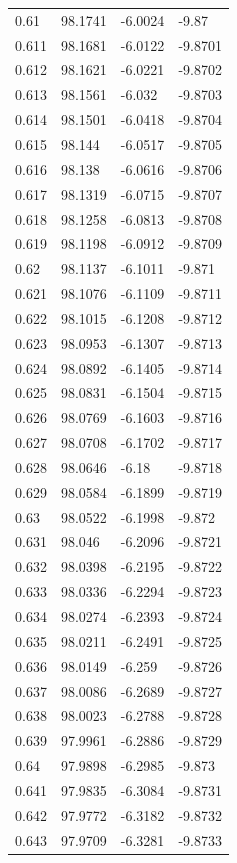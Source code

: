 \begin{tabular}{llll}
0.61 & 98.1741 & -6.0024 & -9.87 \\
0.611 & 98.1681 & -6.0122 & -9.8701 \\
0.612 & 98.1621 & -6.0221 & -9.8702 \\
0.613 & 98.1561 & -6.032 & -9.8703 \\
0.614 & 98.1501 & -6.0418 & -9.8704 \\
0.615 & 98.144 & -6.0517 & -9.8705 \\
0.616 & 98.138 & -6.0616 & -9.8706 \\
0.617 & 98.1319 & -6.0715 & -9.8707 \\
0.618 & 98.1258 & -6.0813 & -9.8708 \\
0.619 & 98.1198 & -6.0912 & -9.8709 \\
0.62 & 98.1137 & -6.1011 & -9.871 \\
0.621 & 98.1076 & -6.1109 & -9.8711 \\
0.622 & 98.1015 & -6.1208 & -9.8712 \\
0.623 & 98.0953 & -6.1307 & -9.8713 \\
0.624 & 98.0892 & -6.1405 & -9.8714 \\
0.625 & 98.0831 & -6.1504 & -9.8715 \\
0.626 & 98.0769 & -6.1603 & -9.8716 \\
0.627 & 98.0708 & -6.1702 & -9.8717 \\
0.628 & 98.0646 & -6.18 & -9.8718 \\
0.629 & 98.0584 & -6.1899 & -9.8719 \\
0.63 & 98.0522 & -6.1998 & -9.872 \\
0.631 & 98.046 & -6.2096 & -9.8721 \\
0.632 & 98.0398 & -6.2195 & -9.8722 \\
0.633 & 98.0336 & -6.2294 & -9.8723 \\
0.634 & 98.0274 & -6.2393 & -9.8724 \\
0.635 & 98.0211 & -6.2491 & -9.8725 \\
0.636 & 98.0149 & -6.259 & -9.8726 \\
0.637 & 98.0086 & -6.2689 & -9.8727 \\
0.638 & 98.0023 & -6.2788 & -9.8728 \\
0.639 & 97.9961 & -6.2886 & -9.8729 \\
0.64 & 97.9898 & -6.2985 & -9.873 \\
0.641 & 97.9835 & -6.3084 & -9.8731 \\
0.642 & 97.9772 & -6.3182 & -9.8732 \\
0.643 & 97.9709 & -6.3281 & -9.8733 \\

\end{tabular}
